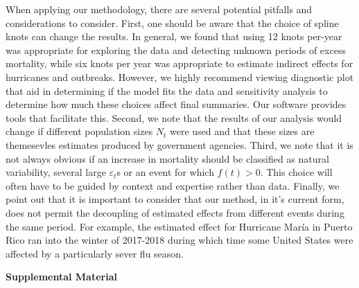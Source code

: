 \documentclass[11pt]{article}
\begin{document}
When applying our methodology, there are several potential pitfalls and considerations to consider. 
First, one should be aware that the choice of spline knots can change the results.  In general, we found that using 12 knots per-year was appropriate for exploring the data and detecting unknown periods of excess mortality, while six knots per year was appropriate to estimate indirect effects for hurricanes and outbreaks. However, we highly recommend viewing diagnostic plot that aid in determining if the model fits the data and sensitivity analysis to determine how much these choices affect final summaries. Our software provides tools that facilitate this. Second, 
we note that the results of our analysis would change if different population sizes $N_t$ were used and that these sizes are themesevles estimates produced by government agencies. Third, 
we note that it is not always obvious if an increase in mortality should be classified as natural variability, several large $\varepsilon_t$s or an event for which $f(t)>0$. This choice will often have to be guided by context and expertise rather than data. Finally, we point out that it is important to consider that our method, in it's current form, does not permit the decoupling of estimated effects from different events during the same period. For example, the estimated effect for Hurricane Mar\'ia in Puerto Rico ran into the winter of 2017-2018 during which time some United States were affected by a particularly sever flu season. 




\newpage
\begin{center}
\LARGE{\textbf{Supplemental Material}}
\end{center}
\end{document}
